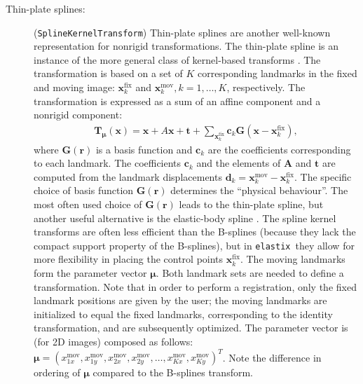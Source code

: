 \documentclass[]{report}
\newcommand{\elastix}{\texttt{elastix}}
\newcommand{\vx}{\bm{x}}
\newcommand{\vmu}{\bm{\mu}}
\newcommand{\vTmx}{\bm{T}_{\vmu}(\bm{x})}
\begin{document}
\begin{description}
\item[Thin-plate splines:] (\texttt{SplineKernelTransform}) Thin-plate
    splines are another well-known representation for nonrigid
    transformations. The thin-plate spline is an instance of the more
    general class of kernel-based transforms \cite{Davis97,Brooks07}. The
    transformation is based on a set of $K$ corresponding landmarks in the
    fixed and moving image: $\vx_k^{\mathrm{fix}}$ and
    $\vx_k^{\mathrm{mov}}, k = 1, \ldots, K$, respectively. The
    transformation is expressed as a sum of an affine component and a
    nonrigid component:
\begin{align}
\vTmx = \vx + A \vx + \bm{t} + \sum_{\vx_k^{\mathrm{fix}}} \bm{c}_k
\bm{G}(\vx - \vx_k^{\mathrm{fix}}),\label{eq:splinekernel}
\end{align}
where $\bm{G}(\bm{r})$ is a basis function and $\bm{c}_k$ are the
coefficients corresponding to each landmark. The coefficients
$\bm{c}_k$ and the elements of $\bm{A}$ and $\bm{t}$ are computed
from the landmark displacements $\bm{d}_k = \vx_k^{\mathrm{mov}} -
\vx_k^{\mathrm{fix}}$. The specific choice of basis function
$\bm{G}(\bm{r})$ determines the ``physical behaviour''. The most
often used choice of $\bm{G}(\bm{r})$ leads to the thin-plate
spline, but another useful alternative is the elastic-body spline
\cite{Davis97}. The spline kernel transforms are often less
efficient than the B-splines (because they lack the compact support
property of the B-splines), but in \elastix\ they allow for more
flexibility in placing the control points $\vx_k^{\mathrm{fix}}$.
The moving landmarks form the parameter vector $\vmu$. Both landmark
sets are needed to define a transformation. Note that in order to
perform a registration, only the fixed landmark positions are given
by the user; the moving landmarks are initialized to equal the fixed
landmarks, corresponding to the identity transformation, and are
subsequently optimized. The parameter vector is (for 2D images)
composed as follows: $\vmu = (x_{1x}^{\mathrm{mov}},
x_{1y}^{\mathrm{mov}}, x_{2x}^{\mathrm{mov}}, x_{2y}^{\mathrm{mov}},
\ldots, x_{Kx}^{\mathrm{mov}}, x_{Ky}^{\mathrm{mov}} )^T$. Note the
difference in ordering of $\vmu$ compared to the B-splines
transform.
\end{description}
\end{document}
